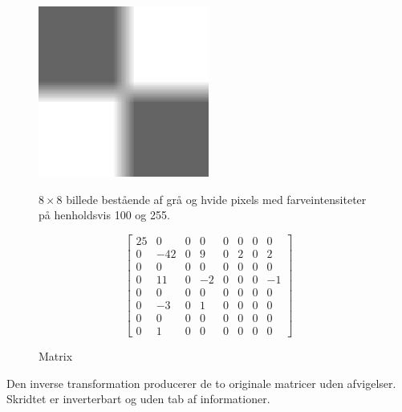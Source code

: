 \begin{figure}[htbp]
\begin{minipage}[b]{0.5\linewidth}
\centering
\includegraphics[width=0.5\textwidth]{Billeder/8x8_eks3.png}
\caption{$8\times8$ billede bestående af grå og hvide pixels med farveintensiteter på henholdsvis 100 og 255.}
\label{fig:8x8halvgrå}
\end{minipage}
\hspace{0.5cm}
\begin{minipage}[b]{0.5\linewidth}
\centering
\[\begin{bmatrix}
25	&	0	&	0	&	0	&	0	&	0	&	0	&	0\\
0	&	-42	&	0	&	9	&	0	&	2	&	0	&	2\\
0	&	0	&	0	&	0	&	0	&	0	&	0	&	0\\
0	&	11	&	0	&	-2	&	0	&	0	&	0	&	-1\\
0	&	0	&	0	&	0	&	0	&	0	&	0	&	0\\
0	&	-3	&	0	&	1	&	0	&	0	&	0	&	0\\
0	&	0	&	0	&	0	&	0	&	0	&	0	&	0\\
0	&	1	&	0	&	0	&	0	&	0	&	0	&	0
\end{bmatrix}
\]
\caption{Matrix}
\label{fig:gråmatrix}
\end{minipage}
\end{figure}

Den inverse transformation producerer de to originale matricer uden afvigelser. Skridtet er inverterbart og uden tab af informationer.



